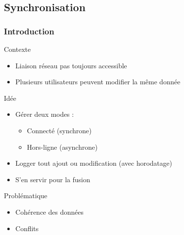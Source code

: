 \subsection{Synchronisation}

\begin{frame}
\tableofcontents[subsectionstyle=show/shaded/hide, subsubsectionstyle=hide, sectionstyle=show/hide]
\end{frame}

\begin{frame}
\frametitle{Introduction}

\begin{block}{Contexte}
\begin{itemize}
    \item Liaison réseau pas toujours accessible
    \item Plusieurs utilisateurs peuvent modifier la même donnée
\end{itemize}
\end{block}

\pause

\begin{exampleblock}{Idée}
\begin{itemize}
    \item Gérer deux modes : 
    \begin{itemize}
        \item Connecté (synchrone)
        \item Hors-ligne (asynchrone)
    \end{itemize}
    \item Logger tout ajout ou modification (avec horodatage)
    \item S'en servir pour la fusion
\end{itemize}
\end{exampleblock}

\pause

\begin{alertblock}{Problématique}
\begin{itemize}
    \item Cohérence des données
    \item Conflits
\end{itemize}
\end{alertblock}

\end{frame} %

